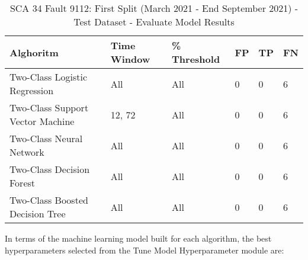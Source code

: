 \begin{table}[!ht]
    \centering
    \begin{tabular}{|l|l|l|l|l|l|}
    \hline
        Alghoritm & Time Window & \% Threshold & FP & TP & FN \\ \hline
        Two-Class Logistic Regression & All & All & 0 & 0 & 6 \\ \hline
        Two-Class Support Vector Machine & 12, 72 & All & 0 & 0 & 6 \\ \hline
        Two-Class Neural Network & All & All & 0 & 0 & 6 \\ \hline
        Two-Class Decision Forest & All & All & 0 & 0 & 6 \\ \hline
        Two-Class Boosted Decision Tree & All & All & 0 & 0 & 6 \\ \hline
    \end{tabular}
    \caption{SCA 34 Fault 9112: First Split (March 2021 - End September 2021) - Test Dataset - Evaluate Model Results}
    \label{9112_SCA34_1st}
\end{table}

In terms of the machine learning model built for each algorithm, the best hyperparameters selected from the Tune Model Hyperparameter module are:

